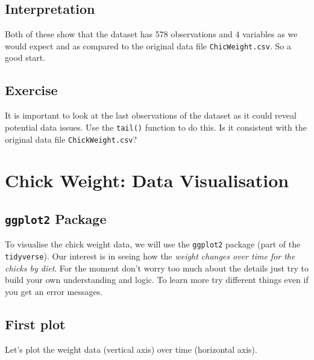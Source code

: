 \documentclass[a4paper,9pt,twocolumn,twoside,printwatermark=false]{pinp}
\begin{document}
\subsection{Interpretation}\label{interpretation}

Both of these show that the dataset has 578 observations and 4 variables
as we would expect and as compared to the original data file
\texttt{ChicWeight.csv}. So a good start.

\subsection{Exercise}\label{exercise-3}

It is important to look at the last observations of the dataset as it
could reveal potential data issues. Use the \texttt{tail()} function to
do this. Is it consistent with the original data file
\texttt{ChickWeight.csv}?

\section{Chick Weight: Data
Visualisation}\label{chick-weight-data-visualisation}

\subsection{\texorpdfstring{\texttt{ggplot2}
Package}{ggplot2 Package}}\label{ggplot2-package}

To visualise the chick weight data, we will use the \texttt{ggplot2}
package (part of the \texttt{tidyverse}). Our interest is in seeing how
the \emph{weight changes over time for the chicks by diet}. For the
moment don't worry too much about the details just try to build your own
understanding and logic. To learn more try different things even if you
get an error messages.

\subsection{First plot}\label{first-plot}

Let's plot the weight data (vertical axis) over time (horizontal axis).

\begin{Shaded}
\begin{Highlighting}[]
\OperatorTok{+}\StringTok{ }\NormalTok{() }
\end{Highlighting}
\end{Shaded}
\end{document}
